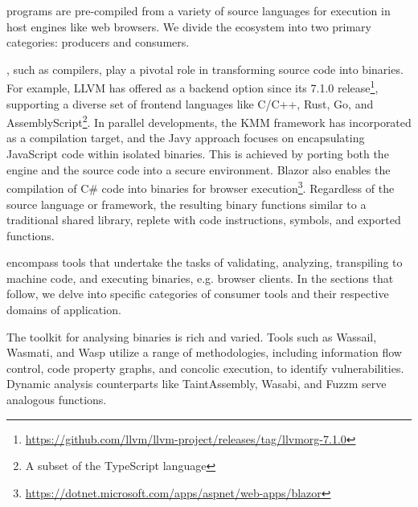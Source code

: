 \label{background:wasm:ecosystems}
\Wasm programs are pre-compiled from a variety of source languages for execution in host engines like web browsers. We divide the \Wasm ecosystem into two primary categories: producers and consumers.

, such as compilers, play a pivotal role in transforming source code into \Wasm binaries. 
For example, LLVM has offered \Wasm as a backend option since its 7.1.0 release\footnote{\url{https://github.com/llvm/llvm-project/releases/tag/llvmorg-7.1.0}}, supporting a diverse set of frontend languages like C/C++, Rust, Go, and AssemblyScript\footnote{A subset of the TypeScript language}.
In parallel developments, the KMM framework\cite{kmm} has incorporated \Wasm as a compilation target, and the Javy approach\cite{Javy} focuses on encapsulating JavaScript code within isolated \Wasm binaries. 
This is achieved by porting both the engine and the source code into a secure \Wasm environment. 
Blazor also enables the compilation of C# code into \Wasm binaries for browser execution\footnote{\url{https://dotnet.microsoft.com/apps/aspnet/web-apps/blazor}}.
Regardless of the source language or framework, the resulting \Wasm binary functions similar to a traditional shared library, replete with code instructions, symbols, and exported functions.

 encompass tools that undertake the tasks of validating, analyzing, transpiling to machine code, and executing \Wasm binaries, e.g. browser clients. 
In the sections that follow, we delve into specific categories of consumer tools and their respective domains of application.


 The toolkit for analysing \Wasm binaries is rich and varied. 
Tools such as Wassail\cite{wassail}, Wasmati\cite{wasmati}, and Wasp\cite{Wasp} utilize a range of methodologies, including information flow control, code property graphs, and concolic execution, to identify vulnerabilities. 
Dynamic analysis counterparts like TaintAssembly\cite{taintassembly}, Wasabi\cite{wasabi}, and Fuzzm\cite{fuzzm} serve analogous functions.

